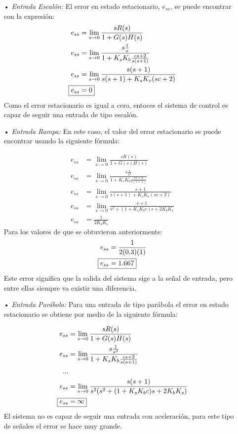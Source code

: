 \documentclass[journal]{IEEEtran}
\begin{document}
\begin{enumerate}
\item[•] \textit{Entrada Escal\'on:} El error en estado 
estacionario, $e_{ss}$, se puede encontrar con la 
expresi\'on: 
\begin{align*}
	e_{ss} & = \lim_{s \to 0}{\frac{s R(s)}{1 + G(s)H(s)}} \\
	e_{ss} & = \lim_{s \to 0}{\frac{s \frac{1}{s}}
	{1 + K_s K_b \frac{cs + 2}{s(s + 1 )} }} \\
	e_{ss} & = \lim_{s \to 0}{\frac{s(s + 1)}
	{s(s + 1) + K_s K_v (sc + 2)}}\\
	\Aboxed {	e_{ss}  &  = 0 }
\end{align*} 
Como el error estacionario es igual a cero, entoces el 
sistema de control es capaz de seguir una entrada de tipo 
escal\'on. \\

\item[•] \textit{Entrada Rampa:} En este caso,
el valor del error estacionario se puede encontrar usando 
la siguiente 
f\'ormula:  

\begin{align*}
	e_{ss} & = \lim_{s \to 0}{\frac{s R(s)}{1 + G(s)H(s)}} \\
	e_{ss} & = \lim_{s \to 0}{\frac{s \frac{1}{s^2}}
	{1 + K_s K_b \frac{cs + 2}{s(s + 1 )} }} \\
	e_{ss} & = \lim_{s \to 0}{\frac{s + 1}
	{s(s + 1) + K_s K_v (sc + 2)}}\\
	e_{ss} & = \lim_{s \to 0}{\frac{ s + 1}
	{s^2 + (1 + K_s K_b c )s + 2 K_b K_s}} \\
	e_{ss}  &  = \frac{1}{2 K_b K_s } 
\end{align*} 
Para los valores de que se obtuvieron anteriormente: 
\begin{align*}
	 e_{ss} & = \frac{1}{2(0.3)(1)} \\
	 \Aboxed{ e_{ss} & = 1.667}
\end{align*}
Este error significa que la salida del sistema sige a la 
se\~nal de entrada, pero entre ellas siempre va existir una
diferencia. \\

\item[•] \textit{Entrada Par\'abola:} Para una entrada de 
tipo par\'abola el error en estado estacionario se obtiene 
por medio de la siguiente f\'ormula: 

\begin{align*}
	e_{ss} & = \lim_{s \to 0}{\frac{s R(s)}
	{1 + G(s)H(s)}} \\
	e_{ss} & = \lim_{s \to 0}{\frac{s \frac{1}{s^3}}
	{1 + K_s K_b \frac{cs + 2}{s(s + 1 )} }} \\
	... \\
	e_{ss} & = \lim_{s \to 0}{\frac{ s(s + 1)}
	{s^2 (s^2 + (1 + K_s K_b c )s + 2 K_b K_s)}} \\
	\Aboxed{ e_{ss} & = \infty}	
\end{align*}
El sistema no es capaz de seguir una entrada con 
aceleraci\'on, para este tipo de se\~nales el error se hace
muy grande. \\
\end{enumerate}
\end{document}
